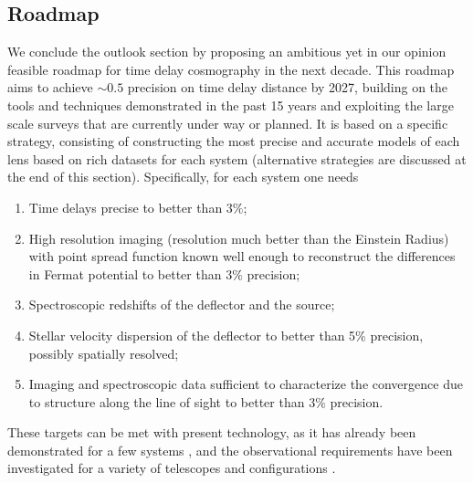 \subsection{Roadmap}
\label{ssec:roadmap}

We conclude the outlook section by proposing an ambitious yet in our
opinion feasible roadmap for time delay cosmography in the next
decade. This roadmap aims to achieve $\sim0.5$ precision on time delay
distance by 2027, building on the tools and techniques demonstrated in
the past 15 years and exploiting the large scale surveys that are
currently under way or planned. It is based on a specific strategy,
consisting of constructing the most precise and accurate models of
each lens based on rich datasets for each system (alternative
strategies are discussed at the end of this section). Specifically,
for each system one needs

\begin{enumerate}
\item Time delays precise to better than $3\%$;
\item High resolution imaging (resolution much better than the Einstein Radius) with point spread function known well enough to reconstruct the differences in Fermat potential to better than $3\%$ precision;
\item Spectroscopic redshifts of the deflector and the source;
\item Stellar velocity dispersion of the deflector to better than 5\% precision, possibly spatially resolved;
\item Imaging and spectroscopic data sufficient to characterize the convergence due to structure along the line of sight to better than $3\%$ precision.
\end{enumerate}

These targets can be met with present technology, as it has already
been demonstrated for a few systems \citep{Tew++13,Suy++13}, and the
observational requirements have been investigated for a variety of
telescopes and configurations
\citep{Gre++13,CollettEtal2013,Men++15,Lin15}.

